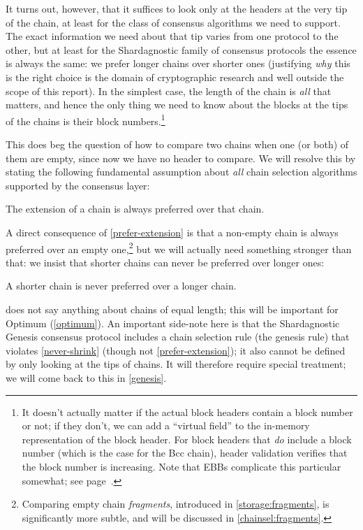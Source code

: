 It turns out, however, that it suffices to look only at the headers at the very
tip of the chain, at least for the class of consensus algorithms we need to
support. The exact information we need about that tip varies from
one protocol to the other, but at least for the Shardagnostic family of consensus
protocols the essence is always the same: we prefer longer chains over shorter
ones (justifying \emph{why} this is the right choice is the domain  of
cryptographic research and well outside the scope of this report). In the
simplest case, the length of the chain is \emph{all} that matters, and hence the
only thing we need to know about the blocks at the tips of the chains is their
block numbers.\footnote{It doesn't actually matter if the actual block headers
contain a block number or not; if they don't, we can add a ``virtual field''
to the in-memory representation of the block header. For block headers that
\emph{do} include a block number (which is the case for the Bcc chain),
header  validation verifies that the block number is increasing. Note that EBBs
complicate this particular somewhat; see page~\pageref{ebb-chain-selection}.}

This does beg the question of how to compare two chains when one (or both) of
them are empty, since now we have no header to compare. We will resolve this by
stating the following fundamental assumption about \emph{all} chain selection
algorithms supported by the consensus layer:

\begin{assumption}
\label{prefer-extension}
The extension of a chain is always preferred over that chain.
\end{assumption}

A direct consequence of \cref{prefer-extension} is that a non-empty chain is
always preferred over an empty one,\footnote{Comparing empty chain
\emph{fragments}, introduced in \cref{storage:fragments}, is significantly more
subtle, and will be discussed in \cref{chainsel:fragments}.} but we will
actually need something stronger than that: we insist that shorter chains can
never be preferred over longer ones:

\begin{assumption}
\label{never-shrink}
A shorter chain is never preferred over a longer chain.
\end{assumption}

 does not say anything about chains of equal length; this will
be important for Optimum (\cref{optimum}). An important side-note here is that
the Shardagnostic Genesis consensus protocol includes a chain selection rule
(the genesis rule) that violates \cref{never-shrink} (though not \cref{prefer-extension}); it also cannot be defined by only looking at the tips of chains.
It will therefore require special treatment; we will come back to this in
\cref{genesis}.

